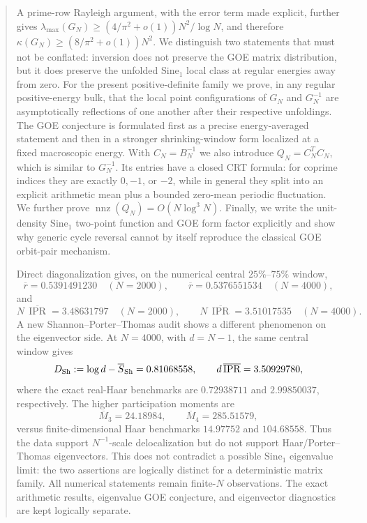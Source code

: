 \documentclass[11pt]{amsart}
\numberwithin{equation}{section}
\theoremstyle{plain}
\theoremstyle{definition}
\theoremstyle{remark}
\newcommand{\IPR}{\operatorname{IPR}}
\begin{document}
\begin{abstract}
A prime-row Rayleigh argument, with the error term made explicit, further gives $\lambda_{\max}(G_N)\ge(4/\pi^2+o(1))N^2/\log N$, and therefore $\kappa(G_N)\ge(8/\pi^2+o(1))N^2$.  We distinguish two statements that must not be conflated: inversion does not preserve the GOE matrix distribution, but it does preserve the unfolded $\mathrm{Sine}_1$ local class at regular energies away from zero.  For the present positive-definite family we prove, in any regular positive-energy bulk, that the local point configurations of $G_N$ and $G_N^{-1}$ are asymptotically reflections of one another after their respective unfoldings.  The GOE conjecture is formulated first as a precise energy-averaged statement and then in a stronger shrinking-window form localized at a fixed macroscopic energy.  With $C_N=B_N^{-1}$ we also introduce $Q_N=C_N^TC_N$, which is similar to $G_N^{-1}$.  Its entries have a closed CRT formula: for coprime indices they are exactly $0,-1$, or $-2$, while in general they split into an explicit arithmetic mean plus a bounded zero-mean periodic fluctuation.  We further prove $\operatorname{nnz}(Q_N)=O(N\log^3N)$.  Finally, we write the unit-density $\mathrm{Sine}_1$ two-point function and GOE form factor explicitly and show why generic cycle reversal cannot by itself reproduce the classical GOE orbit-pair mechanism.

Direct diagonalization gives, on the numerical central $25\%$--$75\%$ window,
\begin{equation}
\overline r=0.5391491230\quad(N=2000),
\qquad
\overline r=0.5376551534\quad(N=4000),
\label{eq:abstract_gap_ratios}
\end{equation}
and
\begin{equation}
N\,\overline{\IPR}=3.48631797\quad(N=2000),
\qquad
N\,\overline{\IPR}=3.51017535\quad(N=4000).
\label{eq:abstract_ipr}
\end{equation}
A new Shannon--Porter--Thomas audit shows a different phenomenon on the eigenvector side.  At $N=4000$, with $d=N-1$, the same central window gives
\begin{equation}
D_{\rm Sh}:=\log d-\overline S_{\rm Sh}=0.81068558,
\qquad
 d\,\overline{\IPR}=3.50929780,
\label{eq:abstract_shannon_ipr_d}
\end{equation}
where the exact real-Haar benchmarks are $0.72938711$ and $2.99850037$, respectively.  The higher participation moments are
\begin{equation}
\overline M_3=24.18984,
\qquad
\overline M_4=285.51579,
\label{eq:abstract_participation_moments}
\end{equation}
versus finite-dimensional Haar benchmarks $14.97752$ and $104.68558$.  Thus the data support $N^{-1}$-scale delocalization but do not support Haar/Porter--Thomas eigenvectors.  This does not contradict a possible $\mathrm{Sine}_1$ eigenvalue limit: the two assertions are logically distinct for a deterministic matrix family.  All numerical statements remain finite-$N$ observations.  The exact arithmetic results, eigenvalue GOE conjecture, and eigenvector diagnostics are kept logically separate.
\end{abstract}
\end{document}
